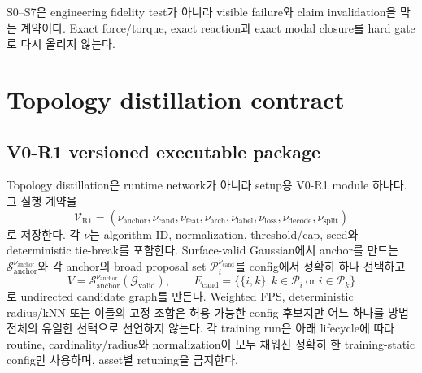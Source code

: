 \documentclass[11pt]{article}
\begin{document}
S0--S7은 engineering fidelity test가 아니라 visible failure와 claim invalidation을 막는 계약이다.
Exact force/torque, exact reaction과 exact modal closure를 hard gate로 다시 올리지 않는다.

\section{Topology distillation contract}

\subsection{V0-R1 versioned executable package}

Topology distillation은 runtime network가 아니라 setup용 V0-R1 module 하나다. 그 실행 계약을
\begin{equation}
  \mathcal V_{\mathrm{R1}}
  =(\nu_{\mathrm{anchor}},\nu_{\mathrm{cand}},\nu_{\mathrm{feat}},
    \nu_{\mathrm{arch}},\nu_{\mathrm{label}},\nu_{\mathrm{loss}},
    \nu_{\mathrm{decode}},\nu_{\mathrm{split}})
  \label{eq:minimal-r1-version-contract}
\end{equation}
로 저장한다. 각 \(\nu\)는 algorithm ID, normalization, threshold/cap, seed와 deterministic tie-break를
포함한다. Surface-valid Gaussian에서 anchor를 만드는
\(\mathcal S_{\mathrm{anchor}}^{\nu_{\mathrm{anchor}}}\)와 각 anchor의 broad proposal set
\(\mathcal P_i^{\nu_{\mathrm{cand}}}\)를 config에서 정확히 하나 선택하고
\begin{equation}
  V=\mathcal S_{\mathrm{anchor}}^{\nu_{\mathrm{anchor}}}(\mathcal G_{\mathrm{valid}}),
  \qquad
  E_{\mathrm{cand}}=\bigl\{\{i,k\}:k\in\mathcal P_i\ \text{or}\ i\in\mathcal P_k\bigr\}
  \label{eq:minimal-r1-anchor-candidate}
\end{equation}
로 undirected candidate graph를 만든다. Weighted FPS, deterministic radius/kNN 또는 이들의 고정
조합은 허용 가능한 config 후보지만 어느 하나를 방법 전체의 유일한 선택으로 선언하지 않는다.
각 training run은 아래 lifecycle에 따라 routine, cardinality/radius와 normalization이 모두 채워진
정확히 한 training-static config만 사용하며, asset별 retuning을 금지한다.
\end{document}
